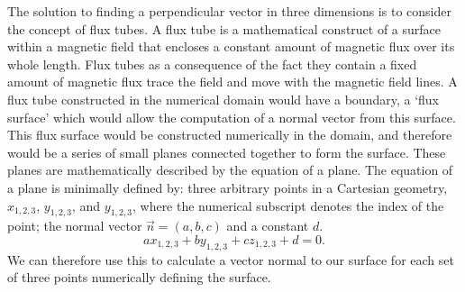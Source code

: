 The solution to finding a perpendicular vector in three dimensions is to consider the concept of flux tubes.
A flux tube is a mathematical construct of a surface within a magnetic field that encloses a constant amount of magnetic flux over its whole length.
Flux tubes as a consequence of the fact they contain a fixed amount of magnetic flux trace the field and move with the magnetic field lines.
A flux tube constructed in the numerical domain would have a boundary, a `flux surface' which would allow the computation of a normal vector from this surface.
This flux surface would be constructed numerically in the domain, and therefore would be a series of small planes connected together to form the surface.
These planes are mathematically described by the equation of a plane.
The equation of a plane is minimally defined by: three arbitrary points in a Cartesian geometry, $x_{1,2,3}$, $y_{1,2,3}$, and $y_{1,2,3}$, where the numerical subscript denotes the index of the point; the normal vector $\vec{n}=(a,b,c)$ and a constant $d$.
\begin{equation}
	ax_{1,2,3}+by_{1,2,3}+cz_{1,2,3}+d=0.
\end{equation}
We can therefore use this to calculate a vector normal to our surface for each set of three points numerically defining the surface.

